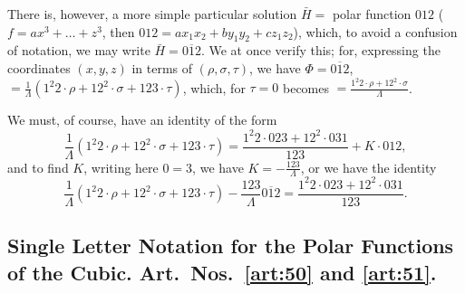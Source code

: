 \documentclass[11pt,a4paper]{book}
\begin{document}
\begin{art}\label{art:49}
There is, however, a more simple particular solution $\bar{H} = $ polar function $012$ ($f = ax^3 + \ldots + z^3$, then $012 = ax_1x_2 + by_1y_2 + cz_1z_2$), which, to avoid a confusion of notation, we may write $\bar{H} = \overline{012}$. We at once verify this; for, expressing the coordinates $(x, y, z)$ in terms of $(\rho, \sigma, \tau)$, we have $\Phi = \overline{012}$, $= \frac{1}{\Lambda}(1^2 2 \cdot \rho + 12^2 \cdot \sigma + 123 \cdot \tau)$, which, for $\tau = 0$ becomes $= \frac{1^2 2 \cdot \rho + 12^2 \cdot \sigma}{\Lambda}$.

We must, of course, have an identity of the form
\[
\frac{1}{\Lambda}(1^2 2 \cdot \rho + 12^2 \cdot \sigma + 123 \cdot \tau) = \frac{1^2 2 \cdot 023 + 12^2 \cdot 031}{123} + K \cdot 012,
\]
and to find $K$, writing here $0 = 3$, we have $K = -\frac{123}{\Lambda}$, or we have the identity
\[
\frac{1}{\Lambda}(1^2 2 \cdot \rho + 12^2 \cdot \sigma + 123 \cdot \tau) - \frac{123}{\Lambda}\overline{012} = \frac{1^2 2 \cdot 023 + 12^2 \cdot 031}{123}.
\]
\end{art}

\subsection*{Single Letter Notation for the Polar Functions of the Cubic. Art.~Nos.~\ref{art:50} and \ref{art:51}.}
\end{document}
